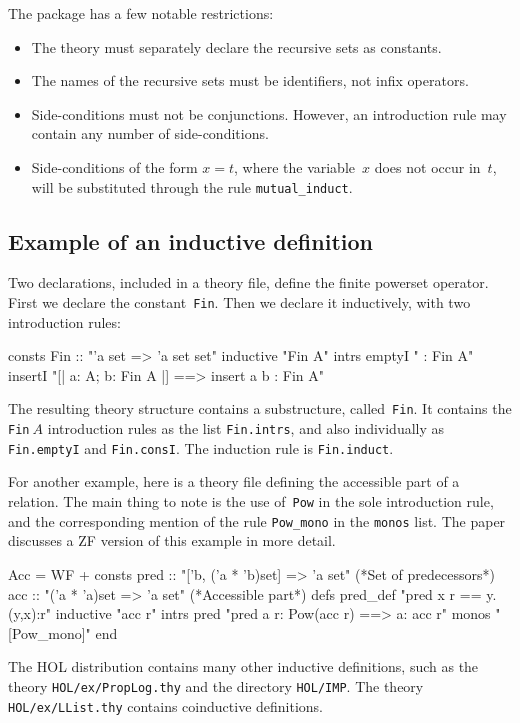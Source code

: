 The package has a few notable restrictions:
\begin{itemize}
\item The theory must separately declare the recursive sets as
  constants.

\item The names of the recursive sets must be identifiers, not infix
operators.  

\item Side-conditions must not be conjunctions.  However, an introduction rule
may contain any number of side-conditions.

\item Side-conditions of the form $x=t$, where the variable~$x$ does not
  occur in~$t$, will be substituted through the rule \verb|mutual_induct|.
\end{itemize}


\subsection{Example of an inductive definition}
Two declarations, included in a theory file, define the finite powerset
operator.  First we declare the constant~{\tt Fin}.  Then we declare it
inductively, with two introduction rules:
\begin{ttbox}
consts Fin :: "'a set => 'a set set"
inductive "Fin A"
  intrs
    emptyI  "{} : Fin A"
    insertI "[| a: A;  b: Fin A |] ==> insert a b : Fin A"
\end{ttbox}
The resulting theory structure contains a substructure, called~{\tt Fin}.
It contains the {\tt Fin}$~A$ introduction rules as the list {\tt Fin.intrs},
and also individually as {\tt Fin.emptyI} and {\tt Fin.consI}.  The induction
rule is {\tt Fin.induct}.

For another example, here is a theory file defining the accessible part of a
relation.  The main thing to note is the use of~{\tt Pow} in the sole
introduction rule, and the corresponding mention of the rule
\verb|Pow_mono| in the {\tt monos} list.  The paper discusses a ZF version
of this example in more detail.
\begin{ttbox}
Acc = WF + 
consts pred :: "['b, ('a * 'b)set] => 'a set"   (*Set of predecessors*)
       acc  :: "('a * 'a)set => 'a set"         (*Accessible part*)
defs   pred_def  "pred x r == {y. (y,x):r}"
inductive "acc r"
  intrs
     pred "pred a r: Pow(acc r) ==> a: acc r"
  monos   "[Pow_mono]"
end
\end{ttbox}
The HOL distribution contains many other inductive definitions, such as the
theory {\tt HOL/ex/PropLog.thy} and the directory {\tt HOL/IMP}.  The
theory {\tt HOL/ex/LList.thy} contains coinductive definitions.

